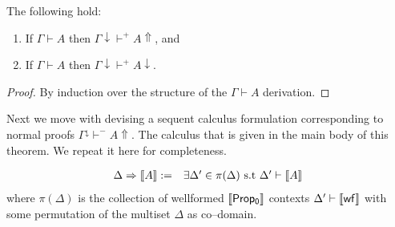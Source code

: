 					\begin{theorem}
						\label{compannot}
						The following hold:
						\begin{enumerate}
							\item If $\Gamma\vdash A$ then $\Gamma\downarrow\vdash^{+} A\Uparrow$, and
							\item If $\Gamma\vdash A$ then $\Gamma\downarrow\vdash^{+} A\downarrow$.
						\end{enumerate}
					\end{theorem}
					\begin{proof}
						By induction over the structure of the $\Gamma\vdash A$ derivation.
					\end{proof}
					
					Next we move with devising a sequent calculus formulation corresponding to normal proofs $\Gamma^{\downarrow}\vdash^{-}A\Uparrow$. The calculus that is given in the main body of this theorem. We repeat it here for completeness.
					\begin{mdframed}[nobreak=true,frametitle={\footnotesize Sequent Calculus ($\llbracket {\sf Prop_0} \rrbracket$)}]
						$$\begin{array}{l r}
						\Delta \Rightarrow \llbracket A\rrbracket:= & \exists \Delta'\in \pi(\Delta)\ \text{s.t} \   
						\Delta'\vdash \llbracket A \rrbracket \end{array}$$
						where $\pi(\Delta)$ is the collection of wellformed  $\llbracket {\sf Prop_0} \rrbracket$ contexts $\Delta'\vdash \llbracket {\sf wf}\rrbracket$  with some permutation of the multiset $\Delta$ as co--domain.
					\end{mdframed} 
					
